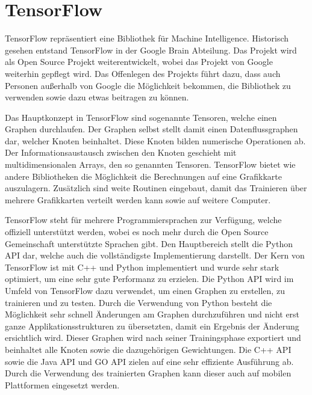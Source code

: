 \chapter{TensorFlow}
\label{cha:TensorFlow}

TensorFlow repräsentiert eine Bibliothek für Machine Intelligence. 
Historisch gesehen entstand TensorFlow in der Google Brain Abteilung.
Das Projekt wird als Open Source Projekt weiterentwickelt, wobei das Projekt von Google weiterhin gepflegt wird. 
Das Offenlegen des Projekts führt dazu, dass auch Personen außerhalb von Google die Möglichkeit bekommen, die Bibliothek zu verwenden sowie dazu etwas beitragen zu können. \newline

\noindent
Das Hauptkonzept in TensorFlow sind sogenannte Tensoren, welche einen Graphen durchlaufen. 
Der Graphen selbst stellt damit einen Datenflussgraphen dar, welcher Knoten beinhaltet. 
Diese Knoten bilden numerische Operationen ab.
Der Informationsaustausch zwischen den Knoten geschieht mit multidimensionalen Arrays, den so genannten Tensoren.
TensorFlow bietet wie andere Bibliotheken die Möglichkeit die Berechnungen auf eine Grafikkarte auszulagern.
Zusätzlich sind weite Routinen eingebaut, damit das Trainieren über mehrere Grafikkarten verteilt werden kann sowie auf weitere Computer. \newline

\noindent
TensorFlow steht für mehrere Programmiersprachen zur Verfügung, welche offiziell unterstützt werden, wobei es noch mehr durch die Open Source Gemeinschaft unterstützte Sprachen gibt.
Den Hauptbereich stellt die Python API dar, welche auch die vollständigste Implementierung darstellt. 
Der Kern von TensorFlow ist mit C++ und Python implementiert und wurde sehr stark optimiert, um eine sehr gute Performanz zu erzielen.
Die Python API wird im Umfeld von TensorFlow dazu verwendet, um einen Graphen zu erstellen, zu trainieren und zu testen. 
Durch die Verwendung von Python besteht die Möglichkeit sehr schnell Änderungen am Graphen durchzuführen und nicht erst ganze Applikationsstrukturen zu übersetzten, damit ein Ergebnis der Änderung ersichtlich wird. 
Dieser Graphen wird nach seiner Trainingsphase exportiert und beinhaltet alle Knoten sowie die dazugehörigen Gewichtungen. 
Die C++ API sowie die Java API und GO API zielen auf eine sehr effiziente Ausführung ab.
Durch die Verwendung des trainierten Graphen kann dieser auch auf mobilen Plattformen eingesetzt werden.

